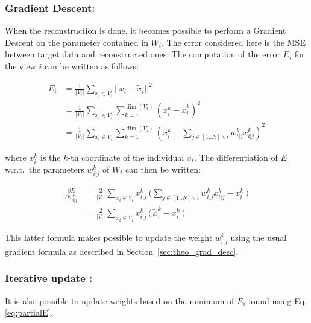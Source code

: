         \subsubsection{Gradient Descent:}
When the reconstruction is done, it becomes possible to perform a Gradient Descent on the parameter contained in $W_i$. The error considered here is the MSE between target data and reconstructed ones. The computation of the error $E_i$ for the view $i$ can be written as follows:
		
    \begin{align*}
        E_i &= \frac{1}{|V_i|}\sum_{x_i \in V_i}||x_i - \widetilde{x}_i||^2\\
        &= \frac{1}{|V_i|}\sum_{x_i \in V_i}\sum_{k=1}^{\dim(V_i)}{(x_i^k - \widetilde{x}_i^k)}^2\\
        &= \frac{1}{|V_i|}\sum_{x_i \in V_i}\sum_{k=1}^{\dim(V_i)}{(x_i^k -
        \sum_{j \in [1..N] \backslash i} w_{i|j}^k x_{i|j}^k)}^2
    \end{align*}
		
where $x_i^k$ is the $k$-th coordinate of the individual $x_i$. The differentiation of $E$ w.r.t.\ the parameters $w_{i|j}^k$ of $W_i$ can then be written:
		
		\begin{align}
\label{eq:partialE}
            \frac{\partial E}{\partial w_{i|j}^k} &= \frac{2}{|V_i|}\sum_{x_i
            \in V_i} x_{i|j}^k \: \big(\sum_{j \in [1..N] \backslash i}
            w_{i|j}^k x_{i|j}^k - x_i^k\:\big) \nonumber \\
			&= \frac{2}{|V_i|}\sum_{x_i \in V_i} x_{i|j}^k \, \big(\,\widetilde{x}_i^k - x_i^k\:\big)
		\end{align}
		
        This latter formula makes possible to update the weight $w_{i|j}^k$ using the usual gradient formula as described in Section~\ref{sec:theo_grad_desc}.
		
		
		\subsubsection{Iterative update :}%
It is also possible to update weights based on the minimum of $E_i$ found using
Eq.\ref{eq:partialE}.
		
